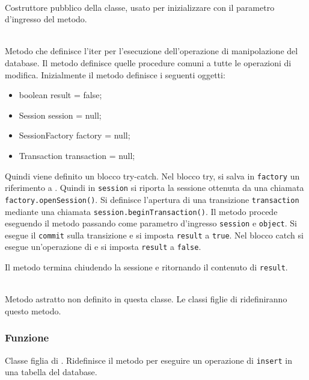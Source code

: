 \begin{description}
	\item{}\\
	Costruttore pubblico della classe, usato per inizializzare  con il parametro d'ingresso del metodo.
	
	\item{}\\
	Metodo che definisce l'iter per l'esecuzione dell'operazione di manipolazione del database. Il metodo definisce quelle procedure comuni a tutte le operazioni di modifica. Inizialmente il metodo definisce i seguenti oggetti:
	\begin{itemize}
		\item boolean result = false;
		\item Session session = null;
		\item SessionFactory factory = null;
		\item Transaction transaction = null;
	\end{itemize}
	
Quindi viene definito un blocco try-catch. Nel blocco try, si salva in \texttt{factory} un riferimento a . Quindi in \texttt{session} si riporta la sessione ottenuta da una chiamata \verb|factory.openSession()|. Si definisce l'apertura di una transizione \texttt{transaction} mediante una chiamata \verb|session.beginTransaction()|. Il metodo procede eseguendo il metodo  passando come parametro d'ingresso \texttt{session} e \texttt{object}. Si esegue il \texttt{commit} sulla transizione e si imposta \texttt{result} a \texttt{true}. Nel blocco catch si esegue un'operazione di  e si imposta \texttt{result} a \texttt{false}.

Il metodo termina chiudendo la sessione e ritornando il contenuto di \texttt{result}.

	\item{}\\
	Metodo astratto non definito in questa classe. Le classi figlie di  ridefiniranno questo metodo.

\end{description}


\subsubsection*{Funzione}
Classe figlia di . Ridefinisce il metodo  per eseguire un operazione di \texttt{insert} in una tabella del database.

